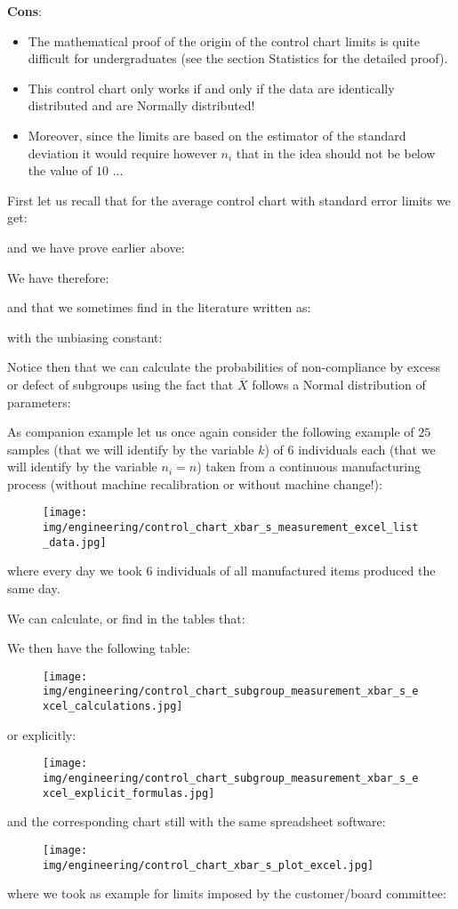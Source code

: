 	\textbf{Cons}:
	\begin{itemize}
		\item The mathematical proof of the origin of the control chart limits is quite difficult for undergraduates (see the section Statistics for the detailed proof).  

		\item This control chart only works if and only if the data are identically distributed and are Normally distributed! 
		
		\item Moreover, since the limits are based on the estimator of the standard deviation it would require however $n_i$ that in the idea should not be below the value of $10$ ...
 	\end{itemize}
 	First let us recall that for the average control chart with standard error limits we get:
	
	and we have prove earlier above:
	
	We have therefore:
	
	and that we sometimes find in the literature written as:
	
	with the unbiasing constant:
	
	Notice then that we can calculate the probabilities of non-compliance by excess or defect of subgroups using the fact that $\overline{X}$ follows a Normal distribution of parameters:
	
	As companion example let us once again consider the following example of $25$ samples (that we will identify by the variable $k$) of $6$ individuals each (that we will identify by the variable $n_i=n$) taken from a continuous manufacturing process (without machine recalibration or without machine change!):
 	\begin{figure}[H]
		\centering
		\texttt{[image: img/engineering/control\_chart\_xbar\_s\_measurement\_excel\_list\_data.jpg]}
	\end{figure}
	where every day we took $6$ individuals of all manufactured items produced the same day.
	
	We can calculate, or find in the tables that:
	
	We then have the following table:
	\begin{figure}[H]
		\centering
		\texttt{[image: img/engineering/control\_chart\_subgroup\_measurement\_xbar\_s\_excel\_calculations.jpg]}
	\end{figure}
	or explicitly:
	\begin{figure}[H]
		\centering
		\texttt{[image: img/engineering/control\_chart\_subgroup\_measurement\_xbar\_s\_excel\_explicit\_formulas.jpg]}
	\end{figure}
	and the corresponding chart still with the same spreadsheet software:
	\begin{figure}[H]
		\centering
		\texttt{[image: img/engineering/control\_chart\_xbar\_s\_plot\_excel.jpg]}
	\end{figure}
	where we took as example for limits imposed by the customer/board committee:
	
